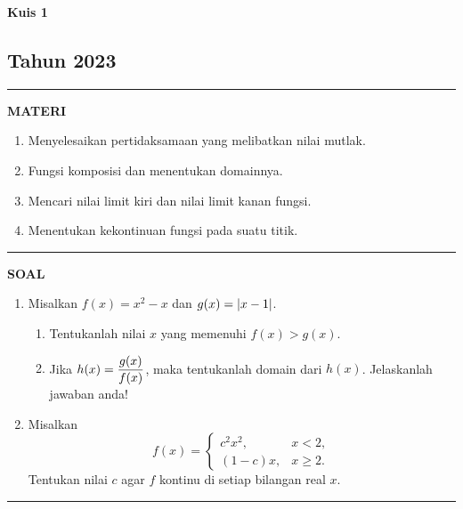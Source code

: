\begin{flushright}
    \textbf{\Large{Kuis 1}}
    \subsection*{Tahun 2023}
\end{flushright}
\vspace{0.5cm}
\hrule height 2pt
\vspace{0.5cm}
\begin{center}
    \textbf{\large{MATERI}}
    \begin{enumerate}[leftmargin=*, label={\arabic*}.]
        \item Menyelesaikan pertidaksamaan yang melibatkan nilai mutlak.
        \item Fungsi komposisi dan menentukan domainnya.
        \item Mencari nilai limit kiri dan nilai limit kanan fungsi.
        \item Menentukan kekontinuan fungsi pada suatu titik.
    \end{enumerate}
\end{center}
\vspace{0.2cm}
\hrule height 1pt
\vspace{0.5cm}
\begin{center}
    \textbf{\large{SOAL}}
\end{center}
\begin{enumerate}[leftmargin=*, label={\arabic*}.]
\item Misalkan $f(x) = x^{2}-x$ dan $g(x)=\lvert x-1\rvert$.
\begin{enumerate}[label={\alph*}.]
    \item Tentukanlah nilai $x$ yang memenuhi $f(x) > g(x)$.
    \item Jika $\displaystyle h(x) = \frac{g(x)}{f(x)}$, maka tentukanlah 
    domain dari $h(x)$. Jelaskanlah jawaban anda!
\end{enumerate}
\item Misalkan
\[
    f(x) =
    \begin{cases}
        c^{2}x^{2}, &{x < 2},\\
        (1-c)x, &{x \geq 2}.
    \end{cases}
\]
Tentukan nilai $c$ agar $f$ kontinu di setiap bilangan real $x$.
\end{enumerate}
\vspace{0.2cm}
\hrule height 1pt
\vspace{0.5cm}

